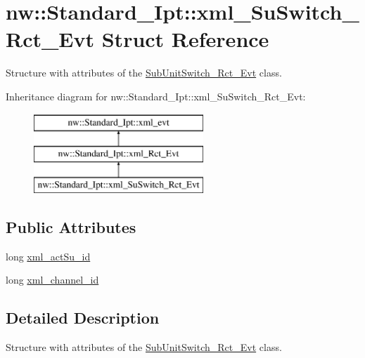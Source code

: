 \hypertarget{structnw_1_1_standard___ipt_1_1xml___su_switch___rct___evt}{\section{nw\+:\+:Standard\+\_\+\+Ipt\+:\+:xml\+\_\+\+Su\+Switch\+\_\+\+Rct\+\_\+\+Evt Struct Reference}
\label{structnw_1_1_standard___ipt_1_1xml___su_switch___rct___evt}
}


Structure with attributes of the \hyperlink{classnw_1_1_sub_unit_switch___rct___evt}{Sub\+Unit\+Switch\+\_\+\+Rct\+\_\+\+Evt} class.  


Inheritance diagram for nw\+:\+:Standard\+\_\+\+Ipt\+:\+:xml\+\_\+\+Su\+Switch\+\_\+\+Rct\+\_\+\+Evt\+:\begin{figure}[H]
\begin{center}
\leavevmode
\includegraphics[height=3.000000cm]{d0/d6c/structnw_1_1_standard___ipt_1_1xml___su_switch___rct___evt}
\end{center}
\end{figure}
\subsection*{Public Attributes}
\begin{DoxyCompactItemize}
\item 
long \hyperlink{structnw_1_1_standard___ipt_1_1xml___su_switch___rct___evt_a620a553d11252834116e4ea4af2dc9ce}{xml\+\_\+act\+Su\+\_\+id}
\item 
long \hyperlink{structnw_1_1_standard___ipt_1_1xml___su_switch___rct___evt_a29b04ff37696230c95a126a104ad065b}{xml\+\_\+channel\+\_\+id}
\end{DoxyCompactItemize}


\subsection{Detailed Description}
Structure with attributes of the \hyperlink{classnw_1_1_sub_unit_switch___rct___evt}{Sub\+Unit\+Switch\+\_\+\+Rct\+\_\+\+Evt} class. 


